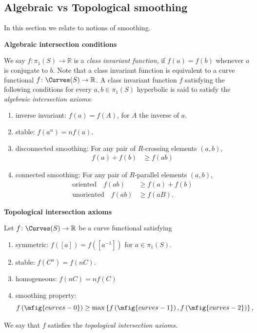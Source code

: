 \subsection{Algebraic vs Topological smoothing}

In this section we relate to notions of smoothing.

\textbf{Algebraic intersection conditions}

We say $f \colon \pi_1(S) \to \mathbb{R}$ is a \emph{class invariant function}, if $f(a)=f(b)$ whenever $a$ is conjugate to $b$. 
Note that a class invariant function is equivalent to a curve functional $f \colon \Curves(S) \to \mathbb{R}$.
A class invariant function $f$ satisfying the following conditions
for every $a,b \in \pi_1(S)$ hyperbolic is said to satisfy the \emph{algebraic intersection axioms}:

\begin{enumerate}
\item inverse invariant: $f(a)=f(A)$, for $A$ the inverse of $a$. 
\item stable: $f(a^n) = nf(a)$.
\item disconnected smoothing: For any pair of $R$-crossing elements $(a,b)$, 
 \begin{align}
    \label{eq:conn_oriented} f(a) + f(b) &\geq f(ab)
  \end{align}
\item connected smoothing: For any pair of $R$-parallel elements $(a,b)$, 
 \begin{align}
    \label{eq:conn_oriented} \mbox{oriented} \quad f(ab) &\geq  f(a) + f(b)\\
    \label{eq:conn_unoriented} \mbox{unoriented} \quad f(ab) &\geq f(aB).
  \end{align}
\end{enumerate}


\textbf{Topological intersection axioms}

Let $f \colon \Curves(S) \to \mathbb{R}$ be a curve functional satisfying

\begin{enumerate}
\item symmetric: $f([a]) = f([a^{-1}])$ for $a \in \pi_1(S)$.
\item stable: $f(C^n) = f(nC)$.
\item homogeneous: $f(nC)=nf(C)$
\item smoothing property:
     \[
      f\left(\mfig{curves-0}\right) \ge \max \left\{ f\left(\mfig{curves-1}\right), f\left(\mfig{curves-2}\right)\right\},
   \]
\end{enumerate}
We say that $f$ satisfies the \emph{topological intersection axioms}.

